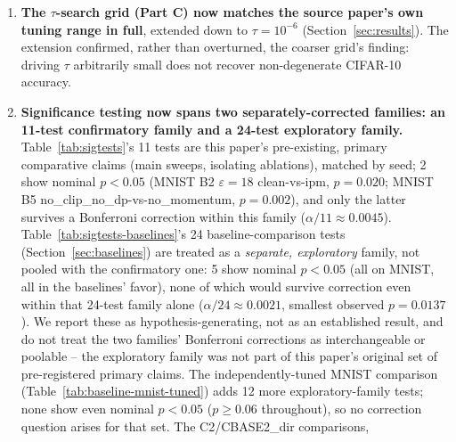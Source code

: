 \documentclass{article}
\begin{document}
\begin{enumerate}
{  clipping.} It uses plain momentum SGD with no batch normalization and no
  gradient clipping at all -- it is not a perfect analog of any federated
  condition in this paper, all of which have clipping active throughout. We
  read its divergence at $\gamma{=}0.1$ as showing clipping is doing real
  stabilizing work at that learning rate (Section~\ref{sec:results}), which
  is consistent with, but does not by itself prove, that same mechanism
  operating identically inside the federated loop; a cleaner isolation would
  add a fourth condition (federated, clipped, but with double-momentum and
  robust aggregation removed) rather than inferring the clipping effect from
  an unclipped centralized run.
\item \textbf{The $\tau$-search grid (Part C) now matches the source paper's
  own tuning range in full}, extended down to $\tau=10^{-6}$
  (Section~\ref{sec:results}). The extension confirmed, rather than
  overturned, the coarser grid's finding: driving $\tau$ arbitrarily small
  does not recover non-degenerate CIFAR-10 accuracy.
\item \textbf{Significance testing now spans two separately-corrected
  families: an 11-test confirmatory family and a 24-test exploratory family.}
  Table~\ref{tab:sigtests}'s 11 tests are this paper's pre-existing, primary
  comparative claims (main sweeps, isolating ablations), matched by seed;
  2 show nominal $p{<}0.05$ (MNIST B2 $\varepsilon{=}18$ clean-vs-ipm,
  $p{=}0.020$; MNIST B5 no\_clip\_no\_dp-vs-no\_momentum, $p{=}0.002$), and
  only the latter survives a Bonferroni correction within this family
  ($\alpha/11\approx0.0045$). Table~\ref{tab:sigtests-baselines}'s 24
  baseline-comparison tests (Section~\ref{sec:baselines}) are treated as a
  \emph{separate, exploratory} family, not pooled with the confirmatory one:
  5 show nominal $p{<}0.05$ (all on MNIST, all in the baselines' favor), none
  of which would survive correction even within that 24-test family alone
  ($\alpha/24\approx0.0021$, smallest observed $p{=}0.0137$). We report these
  as hypothesis-generating, not as an established result, and do not treat
  the two families' Bonferroni corrections as interchangeable or poolable --
  the exploratory family was not part of this paper's original set of
  pre-registered primary claims. The independently-tuned MNIST comparison
  (Table~\ref{tab:baseline-mnist-tuned}) adds 12 more exploratory-family
  tests; none show even nominal $p{<}0.05$ ($p\geq0.06$ throughout), so no
  correction question arises for that set. The C2/CBASE2\_dir comparisons,

\end{enumerate}
\end{document}
